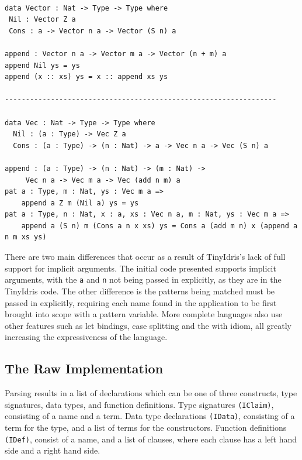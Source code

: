 \documentclass[a4paper]{article}
\begin{document}
\begin{center}
\begin{verbatim}

data Vector : Nat -> Type -> Type where
 Nil : Vector Z a
 Cons : a -> Vector n a -> Vector (S n) a

append : Vector n a -> Vector m a -> Vector (n + m) a
append Nil ys = ys
append (x :: xs) ys = x :: append xs ys

-----------------------------------------------------------------

data Vec : Nat -> Type -> Type where
  Nil : (a : Type) -> Vec Z a
  Cons : (a : Type) -> (n : Nat) -> a -> Vec n a -> Vec (S n) a

append : (a : Type) -> (n : Nat) -> (m : Nat) -> 
	 Vec n a -> Vec m a -> Vec (add n m) a
pat a : Type, m : Nat, ys : Vec m a =>
	append a Z m (Nil a) ys = ys
pat a : Type, n : Nat, x : a, xs : Vec n a, m : Nat, ys : Vec m a =>
	append a (S n) m (Cons a n x xs) ys = Cons a (add m n) x (append a n m xs ys)
\end{verbatim}
\end{center}

There are two main differences that occur as a result of TinyIdris's lack of full
support for implicit arguments. The initial code presented supports
implicit arguments, with the \texttt{a} and \texttt{n} not being passed in explicitly,
as they are in the TinyIdris code. The other difference is the patterns
being matched must be passed in explicitly, requiring each name found 
in the application to be first brought into scope with a pattern 
variable. More complete languages also use other features such as let 
bindings, case splitting and the with idiom, all greatly increasing the
expressiveness of the language.

\subsection{The Raw Implementation}
\label{sec:orgbff7c18}
Parsing results in a list of declarations which can be one of three constructs, type signatures, data types, and function definitions.
Type signatures \texttt{(IClaim)}, consisting of a name and a term. Data type 
declarations \texttt{(IData)}, consisting of a term for the type, and a list of
terms for the constructors. Function definitions \texttt{(IDef)}, consist of a
name, and a list of clauses, where each clause has a left hand side and
a right hand side. 
\end{document}
